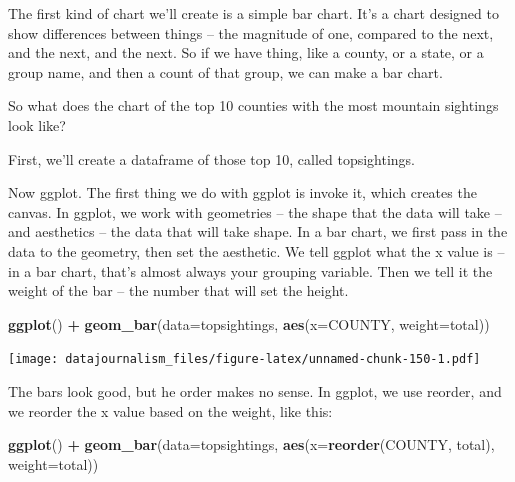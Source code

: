 \documentclass[]{book}
\newenvironment{Shaded}{\begin{snugshade}}{\end{snugshade}}
\newcommand{\DataTypeTok}[1]{\textcolor[rgb]{0.13,0.29,0.53}{#1}}
\newcommand{\DecValTok}[1]{\textcolor[rgb]{0.00,0.00,0.81}{#1}}
\newcommand{\KeywordTok}[1]{\textcolor[rgb]{0.13,0.29,0.53}{\textbf{#1}}}
\newcommand{\NormalTok}[1]{#1}
\newcommand{\OperatorTok}[1]{\textcolor[rgb]{0.81,0.36,0.00}{\textbf{#1}}}
\newcommand{\StringTok}[1]{\textcolor[rgb]{0.31,0.60,0.02}{#1}}
\begin{document}
The first kind of chart we'll create is a simple bar chart. It's a chart designed to show differences between things -- the magnitude of one, compared to the next, and the next, and the next. So if we have thing, like a county, or a state, or a group name, and then a count of that group, we can make a bar chart.

So what does the chart of the top 10 counties with the most mountain sightings look like?

First, we'll create a dataframe of those top 10, called topsightings.

\begin{Shaded}
\end{Shaded}

Now ggplot. The first thing we do with ggplot is invoke it, which creates the canvas. In ggplot, we work with geometries -- the shape that the data will take -- and aesthetics -- the data that will take shape. In a bar chart, we first pass in the data to the geometry, then set the aesthetic. We tell ggplot what the x value is -- in a bar chart, that's almost always your grouping variable. Then we tell it the weight of the bar -- the number that will set the height.

\begin{Shaded}
\begin{Highlighting}[]
\KeywordTok{ggplot}\NormalTok{() }\OperatorTok{+}\StringTok{ }\KeywordTok{geom_bar}\NormalTok{(}\DataTypeTok{data=}\NormalTok{topsightings, }\KeywordTok{aes}\NormalTok{(}\DataTypeTok{x=}\NormalTok{COUNTY, }\DataTypeTok{weight=}\NormalTok{total))}
\end{Highlighting}
\end{Shaded}

\texttt{[image: datajournalism\_files/figure-latex/unnamed-chunk-150-1.pdf]}

The bars look good, but he order makes no sense. In ggplot, we use reorder, and we reorder the x value based on the weight, like this:

\begin{Shaded}
\begin{Highlighting}[]
\KeywordTok{ggplot}\NormalTok{() }\OperatorTok{+}\StringTok{ }\KeywordTok{geom_bar}\NormalTok{(}\DataTypeTok{data=}\NormalTok{topsightings, }\KeywordTok{aes}\NormalTok{(}\DataTypeTok{x=}\KeywordTok{reorder}\NormalTok{(COUNTY, total), }\DataTypeTok{weight=}\NormalTok{total))}
\end{Highlighting}
\end{Shaded}
\end{document}
